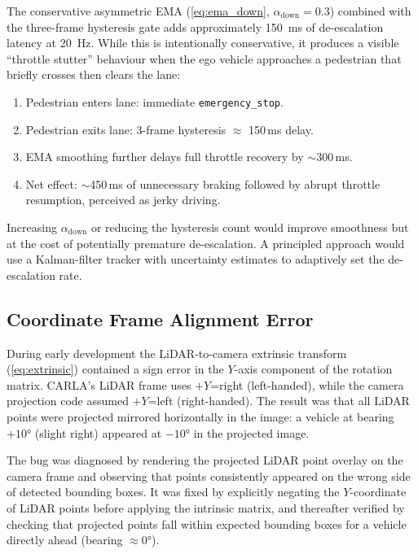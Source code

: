 \documentclass[12pt,a4paper]{article}
\begin{document}
The conservative asymmetric EMA (\cref{eq:ema_down}, $\alpha_\text{down}=0.3$)
combined with the three-frame hysteresis gate adds approximately
\SI{150}{\milli\second} of de-escalation latency at \SI{20}{\hertz}.  While
this is intentionally conservative, it produces a visible ``throttle
stutter'' behaviour when the ego vehicle approaches a pedestrian that
briefly crosses then clears the lane:

\begin{enumerate}[nosep,label=\textbf{\arabic*.}]
  \item Pedestrian enters lane: immediate \texttt{emergency\_stop}.
  \item Pedestrian exits lane: 3-frame hysteresis $\approx$ 150\,ms delay.
  \item EMA smoothing further delays full throttle recovery by $\sim$300\,ms.
  \item Net effect: $\sim$450\,ms of unnecessary braking followed by
        abrupt throttle resumption, perceived as jerky driving.
\end{enumerate}

Increasing $\alpha_\text{down}$ or reducing the hysteresis count would
improve smoothness but at the cost of potentially premature de-escalation.
A principled approach would use a Kalman-filter tracker with uncertainty
estimates to adaptively set the de-escalation rate.

\subsection{Coordinate Frame Alignment Error}

During early development the LiDAR-to-camera extrinsic transform
(\cref{eq:extrinsic}) contained a sign error in the $Y$-axis component of
the rotation matrix.  CARLA's LiDAR frame uses $+Y$=right (left-handed),
while the camera projection code assumed $+Y$=left (right-handed).  The
result was that all LiDAR points were projected mirrored horizontally in
the image: a vehicle at bearing $+10°$ (slight right) appeared at
$-10°$ in the projected image.

The bug was diagnosed by rendering the projected LiDAR point overlay on the
camera frame and observing that points consistently appeared on the wrong side
of detected bounding boxes.  It was fixed by explicitly negating the
$Y$-coordinate of LiDAR points before applying the intrinsic matrix, and
thereafter verified by checking that projected points fall within expected
bounding boxes for a vehicle directly ahead (bearing $\approx 0°$).
\end{document}
